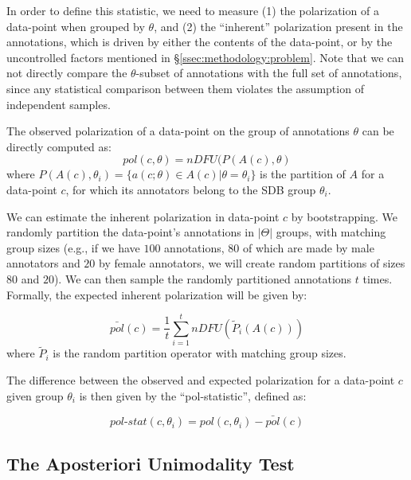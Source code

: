 \documentclass{article}
\begin{document}
In order to define this statistic, we need to measure (1) the polarization of a data-point when grouped by $\theta$, and (2) the ``inherent'' polarization present in the annotations, which is driven by either the contents of the data-point, or by the uncontrolled factors mentioned in \S\ref{ssec:methodology:problem}. Note that we can not directly compare the $\theta$-subset of annotations with the full set of annotations, since any statistical comparison between them violates the assumption of independent samples. %

The observed polarization of a data-point on the group of annotations $\theta$ can be directly computed as: 
 \begin{equation}
 	pol(c, \theta) = nDFU(P(A(c), \theta)
 \end{equation}
 \noindent where $P(A(c), \theta_i) = \{a(c; \theta) \in A(c) | \theta=\theta_i\}$ is the partition of $A$ for a data-point $c$, for which its annotators belong to the \ac{SDB} group $\theta_i$.
 
 We can estimate the inherent polarization in data-point $c$ by bootstrapping. We randomly partition the data-point's annotations in $\lvert \Theta \rvert$ groups, with matching group sizes (e.g., if we have $100$ annotations, $80$ of which are made by male annotators and $20$ by female annotators, we will create random partitions of sizes $80$ and $20$). We can then sample the randomly partitioned annotations $t$ times. Formally, the expected inherent polarization will be given by:
 
 \begin{equation}
 	\label{eq:pol_expected}
 	\bar{pol}(c) = \frac{1}{t} \sum_{i=1}^t  \textit{nDFU}(\tilde{P}_i(A(c)))
 \end{equation}
 \noindent where $\tilde{P}_i$ is the random partition operator with matching group sizes.
 
 The difference between the observed and expected polarization for a data-point $c$ given group $\theta_i$ is then given by the ``pol-statistic'', defined as: 

 \begin{equation}
	\textit{pol-stat}(c, \theta_i)  = pol(c, \theta_i) - \bar{pol}(c)
\end{equation}


\subsection{The Aposteriori Unimodality Test}
\label{ssec:methodology:aposteriori}
\end{document}
